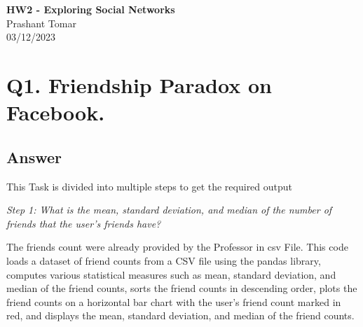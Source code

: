 \documentclass[12pt]{article}
\begin{document}
\begin{centering}
{\large\textbf{HW2 - Exploring Social Networks}}\\ 
Prashant Tomar\\
03/12/2023\\
\end{centering}


\section*{Q1. Friendship Paradox on Facebook.}



\subsection*{Answer}

This Task is divided into multiple steps to get the required output 

\emph{Step 1: What is the mean, standard deviation, and median of the number of friends that the user's friends have?}

The friends count were already provided by the Professor in csv File.
This code loads a dataset of friend counts from a CSV file using the pandas library, computes various statistical measures such as mean, standard deviation, and median of the friend counts, sorts the friend counts in descending order, plots the friend counts on a horizontal bar chart with the user's friend count marked in red, and displays the mean, standard deviation, and median of the friend counts. 
\end{document}
